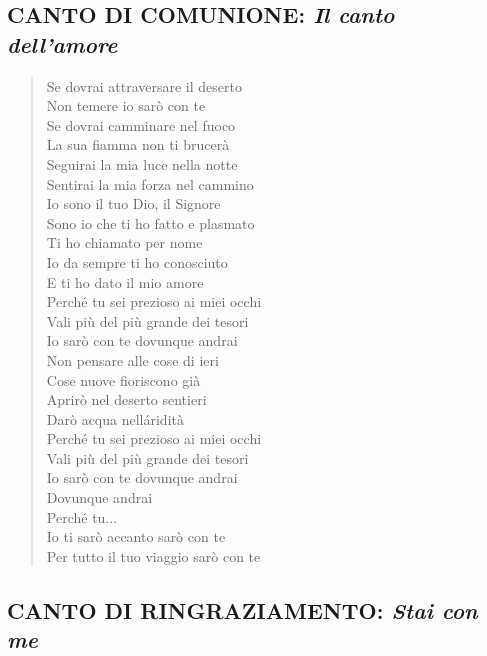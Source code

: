 \subsection*{CANTO DI COMUNIONE: \textit{Il canto dell'amore}}

\begin{verse}
\begin{mystrofe}
Se dovrai attraversare il deserto \\
Non temere io sarò con te \\
Se dovrai camminare nel fuoco \\
La sua fiamma non ti brucerà \\
Seguirai la mia luce nella notte \\
Sentirai la mia forza nel cammino \\
Io sono il tuo Dio, il Signore \\
Sono io che ti ho fatto e plasmato \\
Ti ho chiamato per nome \\
Io da sempre ti ho conosciuto \\
E ti ho dato il mio amore \\
Perché tu sei prezioso ai miei occhi \\
Vali più del più grande dei tesori \\
Io sarò con te dovunque andrai \\
Non pensare alle cose di ieri \\
Cose nuove fioriscono già \\
Aprirò nel deserto sentieri \\
Darò acqua nell\'aridità \\
Perché tu sei prezioso ai miei occhi \\
Vali più del più grande dei tesori \\
Io sarò con te dovunque andrai \\
Dovunque andrai \\
Perché tu... \\
Io ti sarò accanto sarò con te \\
Per tutto il tuo viaggio sarò con te
\end{mystrofe}
\end{verse}

\subsection*{CANTO DI RINGRAZIAMENTO: \textit{Stai con me}}

